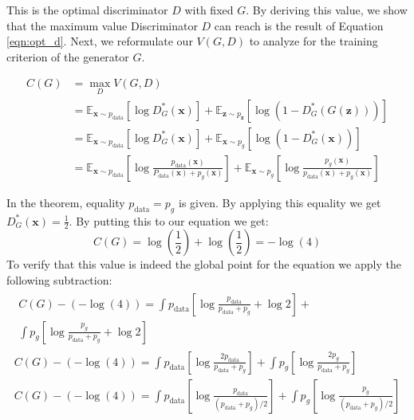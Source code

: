 {This is the optimal discriminator $D$ with fixed $G$. By deriving this value, we show that the
maximum value Discriminator $D$ can reach is the result of Equation \ref{eqn:opt_d}. Next, we reformulate our
$V(G, D)$ to analyze for the training criterion of the generator $G$. 

\begin{align}
    C(G) &= \max _{D} V(G, D) \\[5pt]
    & =\mathbb{E}_{\boldsymbol{x} \sim p_{\mathrm{data}}}\left[\log D_{G}^{*}(\boldsymbol{x})\right]+\mathbb{E}_{\boldsymbol{z} \sim p_{\boldsymbol{z}}}\left[\log \left(1-D_{G}^{*}(G(\boldsymbol{z}))\right)\right] \\[5pt]
    & =\mathbb{E}_{\boldsymbol{x} \sim p_{\mathrm{data}}}\left[\log D_{G}^{*}(\boldsymbol{x})\right]+\mathbb{E}_{\boldsymbol{x} \sim p_{g}}\left[\log \left(1-D_{G}^{*}(\boldsymbol{x})\right)\right] \\[5pt]
    & =\mathbb{E}_{\boldsymbol{x} \sim p_{\mathrm{data}}}\left[\log \frac{p_{\mathrm{data}}(\boldsymbol{x})}{P_{\mathrm{data}}(\boldsymbol{x})+p_{g}(\boldsymbol{x})}\right]+\mathbb{E}_{\boldsymbol{x} \sim p_{g}}\left[\log \frac{p_{g}(\boldsymbol{x})}{p_{\mathrm{data}}(\boldsymbol{x})+p_{g}(\boldsymbol{x})}\right] 
\end{align}

In the theorem, equality $ p_{\text{data}} = p_g$ is given. By applying this equality we get
$D^{*}_G(\boldsymbol{x}) = \frac{1}{2}$. By putting this to our equation we get:
 $$C(G) = \log(\frac{1}{2}) + \log(\frac{1}{2}) = - \log(4)$$
To verify that this value is indeed the global
point for the equation we apply the following subtraction: 
\begin{multline}
    \label{eqn:gan_optim_proof}
    \begin{split}
        C(G)-(-\log (4))  =\int p_{\text {data}}\left[\log \frac{p_{\text {data}}}{p_{\text {data}}+p_{g}}+\log 2\right]+\\ \int p_{g}\left[\log \frac{p_{g}}{p_{\text {data}}+p_{g}}+\log 2\right]
    \end{split}\\[5pt]
    C(G)-(-\log (4)) =\int p_{\text {data}}\left[\log \frac{2 p_{\text {data}}}{p_{\text {data}}+p_{g}}\right]+\int p_{g}\left[\log \frac{2 p_{g}}{p_{\text {data}}+p_{g}}\right]\\[5pt]
    C(G)-(-\log (4)) =\int p_{\text {data}}\left[\log \frac{p_{\text {data}}}{\left(p_{\text {data}}+p_{g}\right) / 2}\right]+\int p_{g}\left[\log \frac{p_{g}}{\left(p_{\text {data}}+p_{g}\right) / 2}\right]
\end{multline}

}
